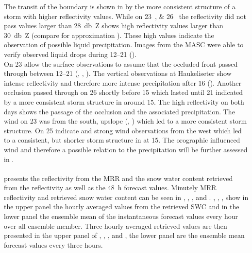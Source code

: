 The transit of the boundary is shown in  by the more consistent structure of a storm with higher reflectivity values. 
While on \SIlist{23;26}{\dec} the reflectivity did not pass values larger than \SI{28}{\decibel Z} shows  high reflectivity values larger than \SI{30}{\decibel Z} (compare for approximation ). These high values indicate the observation of possible liquid precipitation. Images from the MASC were able to verify observed liquid drops during \SIrange{12}{21}{\UTC} (). 
\\
On \SI{23}{\dec} allow the surface observations to assume that the occluded front passed through between \SIrange{12}{21}{\UTC} (, , ). The vertical observations at Haukeliseter show intense reflectivity and therefore more intense precipitation after \SI{16}{\UTC} (). Another occlusion passed through on \SI{26}{\dec} shortly before \SI{15}{\UTC} which lasted until \SI{21}{\UTC} indicated by a more consistent storm structure in  around \SI{15}{\UTC}. The high reflectivity on both days shows the passage of the occlusion and the associated precipitation. The wind on \SI{23}{\dec} was from the south, upslope (, ) which led to a more consistent storm structure. On \SI{25}{\dec} indicate  and  strong wind observations from the west which led to a consistent, but shorter storm structure in  at \SI{15}{\UTC}. The orographic influenced wind and therefore a possible relation to the precipitation will be further assessed in . 
\\
\\
 presents the reflectivity from the MRR and the snow water content retrieved from the reflectivity as well as the \SI{48}{\hour} forecast values. Minutely MRR reflectivity and retrieved snow water content can be seen in , , , and . , , ,  show in the upper panel the hourly averaged values from the retrieved SWC and in the lower panel the ensemble mean of the instantaneous forecast values every hour over all ensemble member.   
Three hourly averaged retrieved values are then presented in the upper panel of , , , and , the lower panel are the ensemble mean forecast values every three hours.
